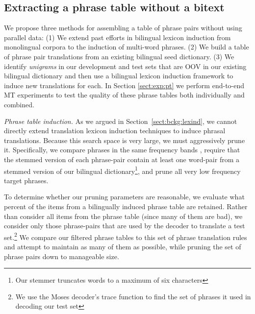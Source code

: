 \documentclass[11pt]{article}
\newcommand{\mnote}[1]{\marginpar{%
  \vskip-\baselineskip
  \raggedright\footnotesize
  \itshape\hrule\smallskip\tiny{#1}\par\smallskip\hrule}}
\newcommand{\mtodo}[1]{\mnote{\textcolor{red}{#1}}}
\newcommand{\todo}[1]{\textcolor{red}{TODO: #1}}
\newcommand{\secref}[1]{Section~\ref{#1}}
\newcommand{\paraheader}[1]{\vskip 0.05in \noindent\emph{#1}}
\begin{document}
\subsection{Extracting a phrase table without a bitext}  \label{sect:extract}
We propose three methods for assembling a table of phrase pairs without using parallel data: (1) We extend past efforts in bilingual lexicon induction from monolingual corpora to the induction of multi-word phrases. (2) We build a table of phrase pair translations from an existing bilingual seed dictionary. (3) We identify \emph {unigrams} in our development and test sets that are OOV in our existing bilingual dictionary and then use a bilingual lexicon induction framework \cite{Rapp:1995} to induce new translations for each. In Section \ref{sect:exp:pt} we perform end-to-end MT experiments to test the quality of these phrase tables both individually and combined.

\paraheader{Phrase table induction.} As we argued in \secref{sect:bckg:lexind}, we cannot directly extend translation lexicon induction techniques to induce phrasal translations.  Because this search space is very large, we must aggressively prune it.   Specifically, we compare phrases in the same frequency bands \cite{Uszkoreit:2010}, require that the stemmed version of each phrase-pair contain at least one word-pair from a stemmed version of our bilingual dictionary\footnote{Our stemmer truncates words to a maximum of six characters}, and prune all very low frequency target phrases. %

To determine whether our pruning parameters are reasonable, we evaluate what percent of the items from a bilingually induced phrase table are retained.  Rather than consider all items from the phrase table (since many of them are bad), we consider only those phrase-pairs that are used by the decoder to translate a test set.\footnote{We use the Moses decoder's trace function to find the set of phrases it used in decoding our test set} We compare our filtered phrase tables to this set of phrase translation rules and attempt to maintain as many of them as possible, while pruning the set of phrase pairs down to manageable size.
\end{document}
